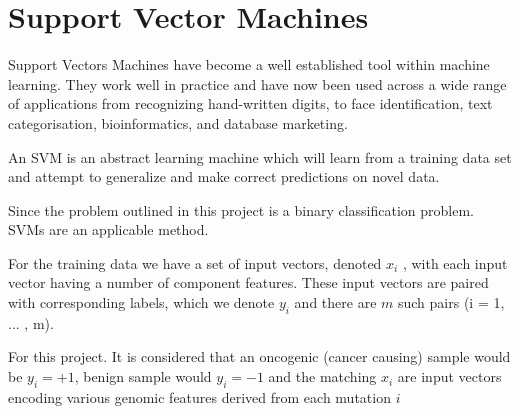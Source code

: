 \section{Support Vector Machines}

Support Vectors Machines have become a well established tool within machine learning. They work well in practice and have now been used across a wide range of applications from recognizing hand-written digits, to face identification, text categorisation, bioinformatics, and database marketing.

An SVM is an abstract learning machine which will learn from a training data set and attempt to generalize and make correct predictions on novel data.

Since the problem outlined in this project is a binary classification problem. SVMs are an applicable method.

For the training data we have a set of input vectors, denoted \(x_i\) , with each input vector having a number of component features. These input vectors are paired with corresponding labels, which we denote \(y_i\) and there are \(m\) such pairs (i = 1, ... , m).

For this project. It is considered that an oncogenic (cancer causing) sample would be \(y_i=+1\), benign sample would \(y_i=-1\) and the matching \(x_i\) are input vectors encoding various genomic features derived from each mutation \(i\)